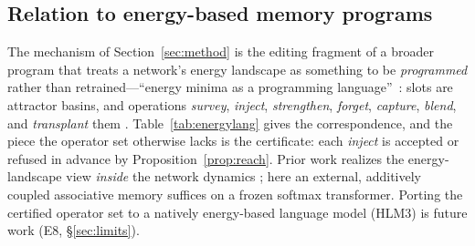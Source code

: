 \documentclass[10pt,twocolumn]{article}
\theoremstyle{remark}
\begin{document}
\subsection{Relation to energy-based memory programs}
\label{sec:energyops}

The mechanism of Section~\ref{sec:method} is the editing fragment of a broader
program that treats a network's energy landscape as something to be
\emph{programmed} rather than retrained---``energy minima as a programming
language''~\citep{qriton2026hlm}: slots are attractor basins, and operations
\emph{survey}, \emph{inject}, \emph{strengthen}, \emph{forget}, \emph{capture},
\emph{blend}, and \emph{transplant} them \citep{qriton2026energylang}.
Table~\ref{tab:energylang} gives the correspondence, and the piece the operator
set otherwise lacks is the certificate: each \emph{inject} is accepted or refused
in advance by Proposition~\ref{prop:reach}. Prior work realizes the
energy-landscape view \emph{inside} the network dynamics
\citep{krotov2016dense, ramsauer2020hopfield, hoover2023energy}; here an
external, additively coupled associative memory suffices on a frozen softmax
transformer. Porting the certified operator set to a natively energy-based
language model (HLM3) is future work (E8, \S\ref{sec:limits}).

\begin{table}[t]
\centering\small
{}
\caption{HLM5 as the \emph{certified} fragment of the energy-language operator set.
The first two rows and the guard carry a-priori guarantees; capture/blend/transplant
are validated only operationally (Table~\ref{tab:energyops}).}
\label{tab:energylang}
\end{table}
\end{document}
